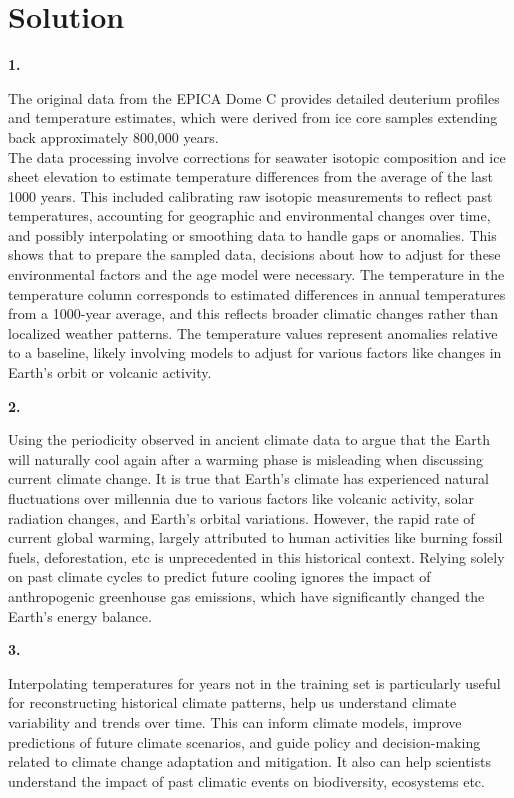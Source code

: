 \documentclass[submit]{harvardml}
\newenvironment{solution}
  {\color{blue}\section*{Solution}}
{}
\begin{document}
\begin{solution}

\textbf{1.}

The original data from the EPICA Dome C provides detailed deuterium profiles and temperature estimates, which were derived from ice core samples extending back approximately 800,000 years.\\

The data processing involve corrections for seawater isotopic composition and ice sheet elevation to estimate temperature differences from the average of the last 1000 years. This included calibrating raw isotopic measurements to reflect past temperatures, accounting for geographic and environmental changes over time, and possibly interpolating or smoothing data to handle gaps or anomalies. This shows that to prepare the sampled data, decisions about how to adjust for these environmental factors and the age model were necessary. The temperature in the temperature column corresponds to estimated differences in annual temperatures from a 1000-year average, and this reflects broader climatic changes rather than localized weather patterns. The temperature values represent anomalies relative to a baseline, likely involving models to adjust for various factors like changes in Earth's orbit or volcanic activity.

\bigskip
\textbf{2.}

Using the periodicity observed in ancient climate data to argue that the Earth will naturally cool again after a warming phase is misleading when discussing current climate change. It is true that Earth's climate has experienced natural fluctuations over millennia due to various factors like volcanic activity, solar radiation changes, and Earth's orbital variations. However, the rapid rate of current global warming, largely attributed to human activities like burning fossil fuels, deforestation, etc is unprecedented in this historical context. Relying solely on past climate cycles to predict future cooling ignores the impact of anthropogenic greenhouse gas emissions, which have significantly changed the Earth's energy balance.

\bigskip
\textbf{3.}

Interpolating temperatures for years not in the training set is particularly useful for reconstructing historical climate patterns, help us understand climate variability and trends over time. This can inform climate models, improve predictions of future climate scenarios, and guide policy and decision-making related to climate change adaptation and mitigation. It also can help scientists understand the impact of past climatic events on biodiversity, ecosystems etc.

\end{solution}
\end{document}
